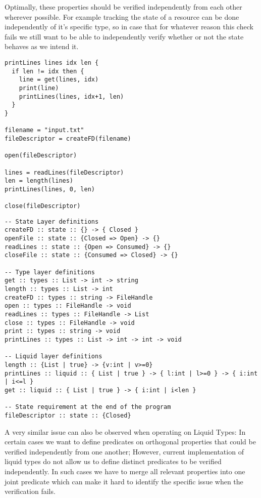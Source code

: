 \documentclass{easychair}
\newcommand{\LayeredTypes}{\textsc{LayeredTypes}}
\begin{document}
Optimally, these properties should be verified independently from each other wherever possible. For example tracking the state of a resource can be done independently of it's specific type, so in case that for whatever reason this check fails we still want to be able to independently verify whether or not the state behaves as we intend it.

\begin{minipage}{0.4\linewidth}
\begin{lstlisting}[caption={Simple example code},label={lst:code_before}]
printLines lines idx len {
  if len != idx then {
    line = get(lines, idx)
    print(line)
    printLines(lines, idx+1, len)
  }
}

filename = "input.txt"
fileDescriptor = createFD(filename)

open(fileDescriptor)

lines = readLines(fileDescriptor)
len = length(lines)
printLines(lines, 0, len)

close(fileDescriptor)
\end{lstlisting}
\end{minipage}%
\begin{minipage}{0.59\linewidth}
\begin{lstlisting}[caption={Annotations for \LayeredTypes},label={lst:code_after}]
-- State Layer definitions
createFD :: state :: {} -> { Closed }
openFile :: state :: {Closed => Open} -> {}
readLines :: state :: {Open => Consumed} -> {}
closeFile :: state :: {Consumed => Closed} -> {}

-- Type layer definitions
get :: types :: List -> int -> string
length :: types :: List -> int
createFD :: types :: string -> FileHandle
open :: types :: FileHandle -> void
readLines :: types :: FileHandle -> List
close :: types :: FileHandle -> void
print :: types :: string -> void
printLines :: types :: List -> int -> int -> void

-- Liquid layer definitions
length :: {List | true} -> {v:int | v>=0}
printLines :: liquid :: { List | true } -> { l:int | l>=0 } -> { i:int | i<=l }
get :: liquid :: { List | true } -> { i:int | i<len }

-- State requirement at the end of the program
fileDescriptor :: state :: {Closed}	
\end{lstlisting}
\end{minipage}

A very similar issue can also be observed when operating on Liquid Types: In certain cases we want to define predicates on orthogonal properties that could be verified independently from one another; However, current implementation of liquid types do not allow us to define distinct predicates to be verified independently. In such cases we have to merge all relevant properties into one joint predicate which can make it hard to identify the specific issue when the verification fails.
\end{document}
